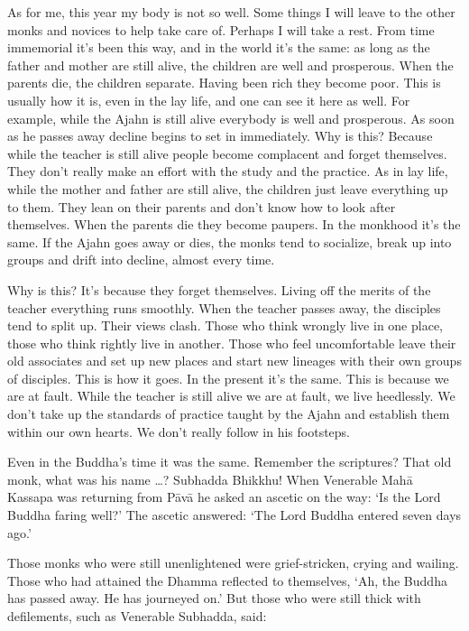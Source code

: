 As for me, this year my body is not so well. Some things I will leave to the other monks and novices to help take care of. Perhaps I will take a rest. From time immemorial it's been this way, and in the world it's the same: as long as the father and mother are still alive, the children are well and prosperous. When the parents die, the children separate. Having been rich they become poor. This is usually how it is, even in the lay life, and one can see it here as well. For example, while the Ajahn is still alive everybody is well and prosperous. As soon as he passes away decline begins to set in immediately. Why is this? Because while the teacher is still alive people become complacent and forget themselves. They don't really make an effort with the study and the practice. As in lay life, while the mother and father are still alive, the children just leave everything up to them. They lean on their parents and don't know how to look after themselves. When the parents die they become paupers. In the monkhood it's the same. If the Ajahn goes away or dies, the monks tend to socialize, break up into groups and drift into decline, almost every time. 

Why is this? It's because they forget themselves. Living off the merits of the teacher everything runs smoothly. When the teacher passes away, the disciples tend to split up. Their views clash. Those who think wrongly live in one place, those who think rightly live in another. Those who feel uncomfortable leave their old associates and set up new places and start new lineages with their own groups of disciples. This is how it goes. In the present it's the same. This is because we are at fault. While the teacher is still alive we are at fault, we live heedlessly. We don't take up the standards of practice taught by the Ajahn and establish them within our own hearts. We don't really follow in his footsteps. 

Even in the Buddha's time it was the same. Remember the scriptures? That old monk, what was his name \ldots{}? Subhadda Bhikkhu! When Venerable Mah\=a Kassapa was returning from P\=av\=a he asked an ascetic on the way: `Is the Lord Buddha faring well?' The ascetic answered: `The Lord Buddha entered  seven days ago.' 

Those monks who were still unenlightened were grief-stricken, crying and wailing. Those who had attained the Dhamma reflected to themselves, `Ah, the Buddha has passed away. He has journeyed on.' But those who were still thick with defilements, such as Venerable Subhadda, said: 

